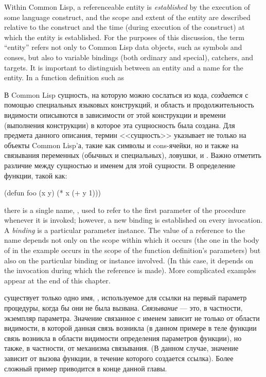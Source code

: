 Within Common Lisp, a referenceable entity is \emph{established} by the execution
of some language construct, and the scope and extent of the entity are
described relative to the construct and the time (during execution of the
construct) at which the entity is established.
For the purposes of this discussion, the term ``entity'' refers not only
to Common Lisp data objects, such as symbols and conses, but also to
variable bindings (both ordinary and special), catchers,
and  targets.  It is important to distinguish between
an entity and a name for the entity.  In a function definition
such as

В Common Lisp сущность, на которую можно сослаться из кода, \emph{создается} с
помощью специальных языковых конструкций, и область и продолжительность
видимости описывются в зависимости от этой конструкции и времени (выполнения
конструкции) в которое эта сущносность была создана.
Для предмета данного описания, термин <<сущность>> указывает не только на
объекты Common Lisp'а, такие как символы и cons-ячейки, но и также на связывания
переменных (обычных и специальных), ловушки, и . Важно
отметить различие между сущностью и именем для этой сущности. В определение
функции, такой как:

\begin{lisp}
(defun foo (x y) (* x (+ y 1)))
\end{lisp}

there is a single name, , used to refer to the first parameter
of the procedure whenever it is invoked; however, a new binding
is established on every invocation.  A \emph{binding} is a particular
parameter instance.  The value of a reference to the name 
depends not only on the scope within which it occurs (the one in
the body of  in the example occurs in the scope of the
function definition's parameters) but also on the particular
binding or instance involved.  (In this case, it depends on the
invocation during which
the reference is made).  More complicated examples
appear at the end of this chapter.

существует только одно имя, , используемое для ссылки на первый параметр
процедуры, когда бы они не была вызвана. \emph{Связывание} --- это, в частности,
экземпляр параметра. Значение связанное с именем  зависит не только от
области видимости, в которой данная связь возникла (в данном примере в теле
функции  связь возникла в области видимости определения параметров
функции), но также, в частности, от механизма связывания. (В данном случае,
значение зависит от вызова функции, в течение которого создается ссылка). Более
сложный пример приводится в конце данной главы. 

